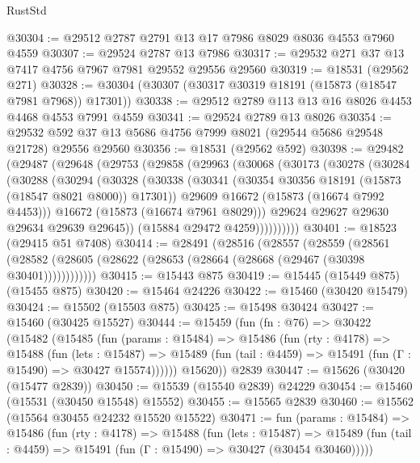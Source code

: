 \begin{lexlean}{RustStd}
\begin{coremodule}
@30304 := @29512 @2787 @2791 @13 @17 @7986 @8029 @8036 @4553 @7960 @4559
@30307 := @29524 @2787 @13 @7986
@30317 := @29532 @271 @37 @13 @7417 @4756 @7967 @7981 @29552 @29556 @29560
@30319 := @18531 (@29562 @271)
@30328 := @30304 (@30307 (@30317 @30319 @18191 (@15873 (@18547 @7981 @7968)) @17301))
@30338 := @29512 @2789 @113 @13 @16 @8026 @4453 @4468 @4553 @7991 @4559
@30341 := @29524 @2789 @13 @8026
@30354 := @29532 @592 @37 @13 @5686 @4756 @7999 @8021 (@29544 @5686 @29548 @21728) @29556 @29560
@30356 := @18531 (@29562 @592)
@30398 := @29482
    (@29487
      (@29648
        (@29753
          (@29858
            (@29963
              (@30068
                (@30173
                  (@30278
                    (@30284
                      (@30288
                        (@30294
                          (@30328
                            (@30338
                              (@30341 (@30354 @30356 @18191 (@15873 (@18547 @8021 @8000)) @17301))
                              @29609
                              @16672
                              (@15873 (@16674 @7992 @4453)))
                            @16672
                            (@15873 (@16674 @7961 @8029)))
                          @29624
                          @29627
                          @29630
                          @29634
                          @29639
                          @29645))
                      (@15884 @29472 @4259))))))))))
@30401 := @18523 (@29415 @51 @7408)
@30414 := @28491
    (@28516
      (@28557
        (@28559
          (@28561 (@28582 (@28605 (@28622 (@28653 (@28664 (@28668 (@29467 (@30398 @30401))))))))))))
@30415 := @15443 @875
@30419 := @15445 (@15449 @875) (@15455 @875)
@30420 := @15464 @24226
@30422 := @15460 (@30420 @15479)
@30424 := @15502 (@15503 @875)
@30425 := @15498 @30424
@30427 := @15460 (@30425 @15527)
@30444 := @15459
    (fun (fn : @76) =>
    @30422
      (@15482
        (@15485
          (fun (params : @15484) =>
          @15486
            (fun (rty : @4178) =>
            @15488
              (fun (lets : @15487) =>
              @15489 (fun (tail : @4459) => @15491 (fun (Γ : @15490) => @30427 @15574))))))
        @15620))
    @2839
@30447 := @15626 (@30420 (@15477 @2839))
@30450 := @15539 (@15540 @2839) @24229
@30454 := @15460 (@15531 (@30450 @15548) @15552)
@30455 := @15565 @2839
@30460 := @15562 (@15564 @30455 @24232 @15520 @15522)
@30471 := fun (params : @15484) =>
  @15486
    (fun (rty : @4178) =>
    @15488
      (fun (lets : @15487) =>
      @15489 (fun (tail : @4459) => @15491 (fun (Γ : @15490) => @30427 (@30454 @30460)))))

\end{coremodule}
\end{lexlean}
